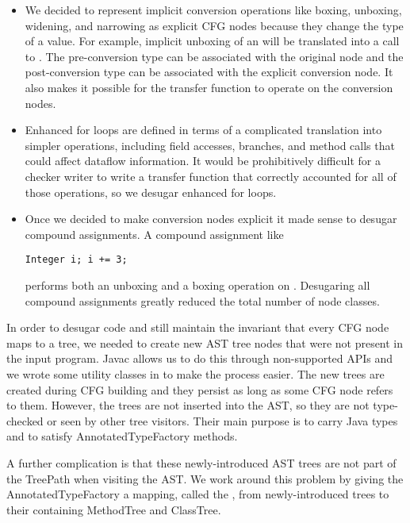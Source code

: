     \begin{itemize}
    \item We decided to represent implicit conversion operations like boxing, unboxing, widening,
    and narrowing as explicit CFG nodes because they change the type of a value.  For example, 
    implicit unboxing of an  will be translated into a call to .
    The pre-conversion
    type can be associated with the original node and the post-conversion type can be associated
    with the explicit conversion node.  It also makes it possible for the transfer function to operate
    on the conversion nodes.

    \item Enhanced for loops are defined in terms of a complicated translation into simpler
    operations, including field accesses, branches, and method calls that could affect dataflow
    information.  It would be prohibitively difficult for a checker writer to write a transfer function that
    correctly accounted for all of those operations, so we desugar enhanced for loops.
    
    \item Once we decided to make conversion nodes explicit it made sense to desugar
    compound assignments.  A compound assignment like \begin{verbatim}Integer i; i += 3;\end{verbatim} performs
    both an unboxing and a boxing operation on .  Desugaring all compound assignments
    greatly reduced the total number of node classes.

    \end{itemize}

In order to desugar code and still maintain the invariant that every CFG node maps to a tree, 
we needed to create new AST tree nodes that were not present in the input program.  Javac
allows us to do this through non-supported APIs and we wrote some utility classes in
 to make the process easier.  The new trees are created during CFG building
and they persist as long as some CFG node refers to them.  However, the trees are not
inserted into the AST, so they are not type-checked or seen by other tree visitors.  Their
main purpose is to carry Java types and to satisfy AnnotatedTypeFactory methods.

A further complication is that these newly-introduced AST trees are not part of the TreePath
when visiting the AST.  We work around this problem by giving the AnnotatedTypeFactory a
mapping, called the , from newly-introduced trees to their containing
MethodTree and ClassTree.

